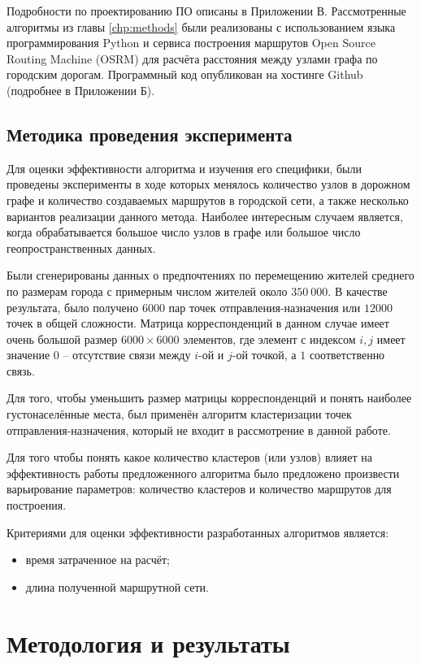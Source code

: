 Подробности по проектированию ПО описаны в Приложении В. Рассмотренные алгоритмы из главы \ref{chp:methods} 
были реализованы с использованием языка программирования Python и сервиса построения маршрутов Open Source 
Routing Machine (OSRM) для расчёта расстояния между узлами графа по городским дорогам. Программный код 
опубликован на хостинге Github (подробнее в Приложении Б).

\section{Методика проведения эксперимента}
Для оценки эффективности алгоритма и изучения его специфики, были проведены эксперименты в ходе которых 
менялось количество узлов в дорожном графе и количество создаваемых маршрутов в городской сети, а также 
несколько вариантов реализации данного метода. Наиболее интересным случаем является, когда обрабатывается 
большое число узлов в графе или большое число геопространственных данных.

Были сгенерированы данных о предпочтениях по перемещению жителей среднего по размерам города с примерным 
числом жителей около \( 350\ 000 \). В качестве результата, было получено \( 6000 \) пар точек 
отправления-назначения или \( 12000 \) точек в общей сложности. Матрица корреспонденций в данном случае имеет 
очень большой размер \( 6000 \times 6000 \) элементов, где элемент с индексом \( i, j \) имеет значение 
\( 0 \) -- отсутствие связи между \( i \)-ой и \( j \)-ой точкой, а \( 1 \) соответственно связь.

Для того, чтобы уменьшить размер матрицы корреспонденций и понять наиболее густонаселённые места, был 
применён алгоритм кластеризации точек отправления-назначения, который не входит в рассмотрение в данной 
работе.

Для того чтобы понять какое количество кластеров (или узлов) влияет на эффективность работы предложенного 
алгоритма было предложено произвести варьирование параметров: количество кластеров и количество маршрутов для 
построения.

Критериями для оценки эффективности разработанных алгоритмов является:
\begin{itemize}
    \item время затраченное на расчёт;
    \item длина полученной маршрутной сети.
\end{itemize}

\chapter{Методология и результаты}
